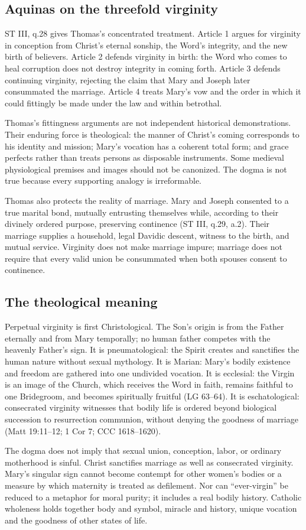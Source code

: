 \subsection{Aquinas on the threefold virginity}

ST III, q.28 gives Thomas's concentrated treatment. Article 1 argues for virginity in conception from Christ's eternal sonship, the Word's integrity, and the new birth of believers. Article 2 defends virginity in birth: the Word who comes to heal corruption does not destroy integrity in coming forth. Article 3 defends continuing virginity, rejecting the claim that Mary and Joseph later consummated the marriage. Article 4 treats Mary's vow and the order in which it could fittingly be made under the law and within betrothal.

Thomas's fittingness arguments are not independent historical demonstrations. Their enduring force is theological: the manner of Christ's coming corresponds to his identity and mission; Mary's vocation has a coherent total form; and grace perfects rather than treats persons as disposable instruments. Some medieval physiological premises and images should not be canonized. The dogma is not true because every supporting analogy is irreformable.

Thomas also protects the reality of marriage. Mary and Joseph consented to a true marital bond, mutually entrusting themselves while, according to their divinely ordered purpose, preserving continence (ST III, q.29, a.2). Their marriage supplies a household, legal Davidic descent, witness to the birth, and mutual service. Virginity does not make marriage impure; marriage does not require that every valid union be consummated when both spouses consent to continence.

\subsection{The theological meaning}

Perpetual virginity is first Christological. The Son's origin is from the Father eternally and from Mary temporally; no human father competes with the heavenly Father's sign. It is pneumatological: the Spirit creates and sanctifies the human nature without sexual mythology. It is Marian: Mary's bodily existence and freedom are gathered into one undivided vocation. It is ecclesial: the Virgin is an image of the Church, which receives the Word in faith, remains faithful to one Bridegroom, and becomes spiritually fruitful (LG 63--64). It is eschatological: consecrated virginity witnesses that bodily life is ordered beyond biological succession to resurrection communion, without denying the goodness of marriage (Matt 19:11--12; 1 Cor 7; CCC 1618--1620).

The dogma does not imply that sexual union, conception, labor, or ordinary motherhood is sinful. Christ sanctifies marriage as well as consecrated virginity. Mary's singular sign cannot become contempt for other women's bodies or a measure by which maternity is treated as defilement. Nor can ``ever-virgin'' be reduced to a metaphor for moral purity; it includes a real bodily history. Catholic wholeness holds together body and symbol, miracle and history, unique vocation and the goodness of other states of life.
